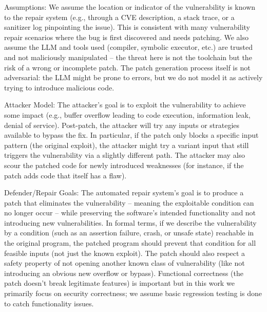 \documentclass[conference,compsoc]{IEEEtran}
\begin{document}
Assumptions: We assume the location or indicator of the vulnerability is
known to the repair system (e.g., through a CVE description, a stack
trace, or a sanitizer log pinpointing the issue). This is consistent
with many vulnerability repair scenarios where the bug is first
discovered and needs patching. We also assume the LLM and tools used
(compiler, symbolic executor, etc.) are trusted and not maliciously
manipulated -- the threat here is not the toolchain but the risk of a
wrong or incomplete patch. The patch generation process itself is not
adversarial: the LLM might be prone to errors, but we do not model it as
actively trying to introduce malicious code.

Attacker Model: The attacker's goal is to exploit the vulnerability to
achieve some impact (e.g., buffer overflow leading to code execution,
information leak, denial of service). Post-patch, the attacker will try
any inputs or strategies available to bypass the fix. In particular, if
the patch only blocks a specific input pattern (the original exploit),
the attacker might try a variant input that still triggers the
vulnerability via a slightly different path. The attacker may also scour
the patched code for newly introduced weaknesses (for instance, if the
patch adds code that itself has a flaw).

Defender/Repair Goals: The automated repair system's goal is to produce
a patch that eliminates the vulnerability -- meaning the exploitable
condition can no longer occur -- while preserving the software's
intended functionality and not introducing new vulnerabilities. In
formal terms, if we describe the vulnerability by a condition (such as
an assertion failure, crash, or unsafe state) reachable in the original
program, the patched program should prevent that condition for all
feasible inputs (not just the known exploit). The patch should also
respect a safety property of not opening another known class of
vulnerability (like not introducing an obvious new overflow or bypass).
Functional correctness (the patch doesn't break legitimate features) is
important but in this work we primarily focus on security correctness;
we assume basic regression testing is done to catch functionality
issues.
\end{document}
